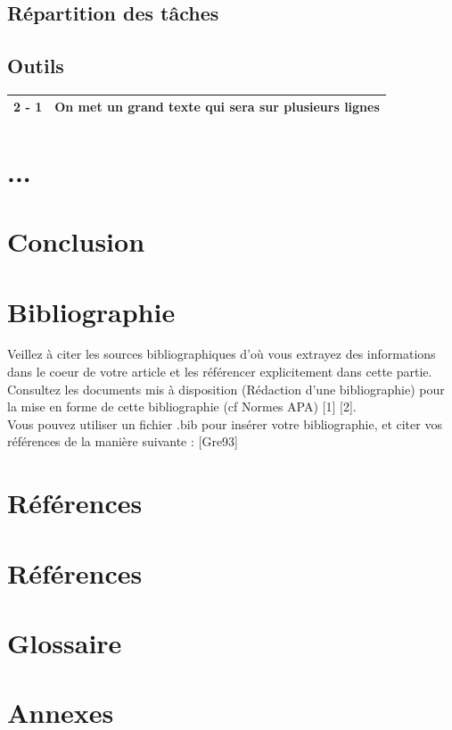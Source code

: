 \documentclass[12pt,a4paper, twoside]{article}
\begin{document}
\subsection{Répartition des tâches}
\subsection{Outils}
\newpage

\begin{center}
\begin{tabular}{|c|p{8cm}|}

\hline
2 - 1 & On met un grand texte qui sera sur plusieurs lignes \\
\hline
\end{tabular}
\end{center}
\section{...}
\section{Conclusion}
\section{Bibliographie}
Veillez à citer les sources bibliographiques d’où vous extrayez des informations dans le coeur de votre article et les référencer explicitement dans cette partie. \\Consultez les documents mis à disposition (Rédaction d’une bibliographie) pour la mise en forme de cette bibliographie (cf Normes APA) [1] [2].\\
    Vous pouvez utiliser un fichier .bib pour insérer votre bibliographie, et citer vos références de la manière suivante : [Gre93]
\section*{Références}
\newpage
\section*{Références}
\section*{Glossaire}
\section{Annexes}
\end{document}

